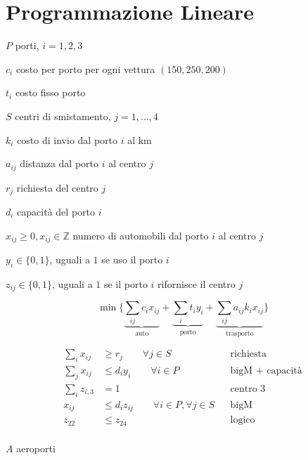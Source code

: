 \chapter{Programmazione Lineare}

\Es

\Par

$P$ porti, $i=1,2,3$

$c_{i}$ costo per porto per ogni vettura $( 150,250,200)$

$t_{i}$ costo fisso porto

$S$ centri di smistamento, $j=1,\dotsc ,4$

$k_{i}$ costo di invio dal porto $i$ al km

$a_{ij}$ distanza dal porto $i$ al centro $j$

$r_{j}$ richiesta del centro $j$

$d_{i}$ capacità del porto $i$

\Var

$x_{ij} \geq 0,x_{ij} \in \mathbb{Z}$ numero di automobili dal porto $i$ al centro $j$

$y_{i} \in \{0,1\}$, uguali a $1$ se uso il porto $i$

$z_{ij} \in \{0,1\}$, uguali a $1$ se il porto $i$ rifornisce il centro $j$

\Fob

\begin{equation*}
	\min\bigg\{\underbrace{\sum _{ij} c_{i} x_{ij}}_{\text{auto}} +\underbrace{\sum _{i} t_{i} y_{i}}_{\text{porto}} +\underbrace{\sum _{ij} a_{ij} k_{i} x_{ij}}_{\text{trasporto}}\bigg\}
\end{equation*}

\Vin

\begin{align*}
	\sum _{i} x_{ij} &\geq r_{j} \qquad\forall j\in S && \text{richiesta}\\
	\sum _{j} x_{ij} &\leq d_{i} y_{i} \qquad\forall i\in P && \text{bigM + capacità}\\
	\sum _{i} z_{i,3} &=1 && \text{centro 3}\\
	x_{ij} &\leq d_{i} z_{ij} \qquad\forall i\in P,\forall j\in S && \text{bigM}\\
	z_{22} &\leq z_{24} && \text{logico}\\
\end{align*}

\Es

\Par

$A$ aeroporti

